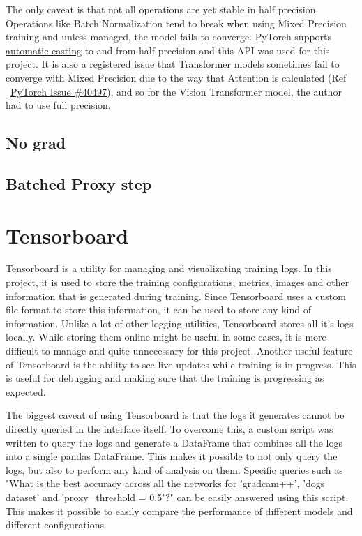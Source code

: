 The only caveat is that not all operations are yet stable in half precision. Operations like Batch Normalization tend to break when using Mixed Precision training and unless managed, the model fails to converge. PyTorch supports \href{https://pytorch.org/docs/stable/notes/amp_examples.html}{automatic casting} to and from half precision and this API was used for this project. It is also a registered issue that Transformer models sometimes fail to converge with Mixed Precision due to the way that Attention is calculated (Ref ~\href{https://github.com/pytorch/pytorch/issues/40497}{PyTorch Issue \#40497}), and so for the Vision Transformer \cite{dosovitskiyImageWorth16x162021} model, the author had to use full precision.
\subsection{No grad}
\subsection{Batched Proxy step}

\section{Tensorboard}
Tensorboard is a utility for managing and visualizating training logs. In this project, it is used to store the training configurations, metrics, images and other information that is generated during training. Since Tensorboard uses a custom file format to store this information, it can be used to store any kind of information. Unlike a lot of other logging utilities, Tensorboard stores all it's logs locally. While storing them online might be useful in some cases, it is more difficult to manage and quite unnecessary for this project. 
Another useful feature of Tensorboard is the ability to see live updates while training is in progress. This is useful for debugging and making sure that the training is progressing as expected.

The biggest caveat of using Tensorboard is that the logs it generates cannot be directly queried in the interface itself. To overcome this, a custom script was written to query the logs and generate a DataFrame that combines all the logs into a single pandas DataFrame. This makes it possible to not only query the logs, but also to perform any kind of analysis on them. Specific queries such as "What is the best accuracy across all the networks for 'gradcam++', 'dogs dataset' and 'proxy\_threshold = 0.5'?" can be easily answered using this script. This makes it possible to easily compare the performance of different models and different configurations. 

